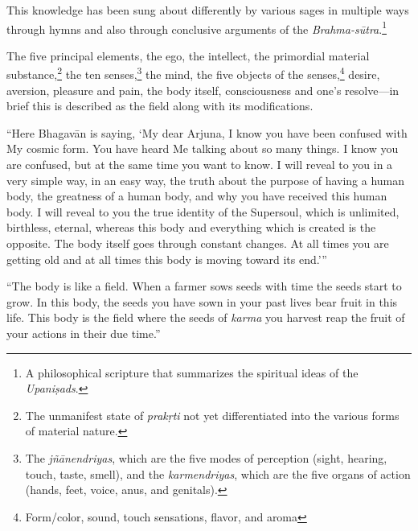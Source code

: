 {This knowledge has been sung about differently by various sages in multiple ways through hymns and also through conclusive arguments of the \textit{Brahma-sūtra}.\footnote{A philosophical scripture that summarizes the spiritual ideas of the \textit{Upaniṣads}.}}

{The five principal elements, the ego, the intellect, the primordial material substance,\footnote{The unmanifest state of \textit{prakṛti} not yet differentiated into the various forms of material nature.} the ten senses,\footnote{The \textit{jñānendriyas}, which are the five modes of perception (sight, hearing, touch, taste, smell), and the \textit{karmendriyas}, which are the five organs of action (hands, feet, voice, anus, and genitals).} the mind, the five objects of the senses,\footnote{Form/color, sound, touch sensations, flavor, and aroma} desire, aversion, pleasure and pain, the body itself, consciousness and one’s resolve---in brief this is described as the field along with its modifications.}

\enquote{Here Bhagavān is saying, \enquote{My dear Arjuna, I know you have been confused with My cosmic form. You have heard Me talking about so many things. I know you are confused, but at the same time you want to know. I will reveal to you in a very simple way, in an easy way, the truth about the purpose of having a human body, the greatness of a human body, and why you have received this human body. I will reveal to you the true identity of the Supersoul, which is unlimited, birthless, eternal, whereas this body and everything which is created is the opposite. The body itself goes through constant changes. At all times you are getting old and at all times this body is moving toward its end.}}

\enquote{The body is like a field. When a farmer sows seeds with time the seeds start to grow. In this body, the seeds you have sown in your past lives bear fruit in this life. This body is the field where the seeds of \textit{karma} you harvest reap the fruit of your actions in their due time.}

